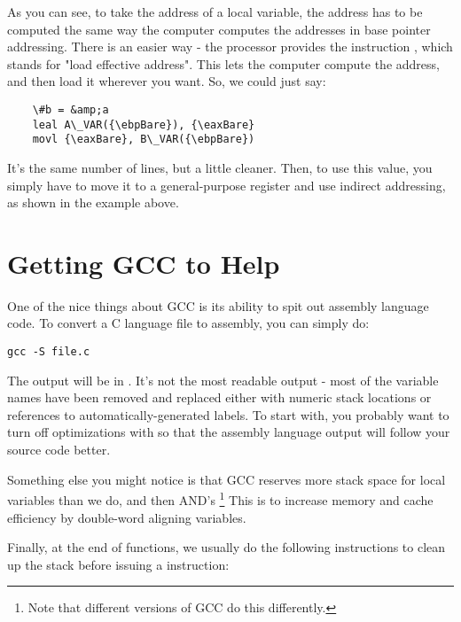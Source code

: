 As you can see, to take the address of a local variable, the address has to
be computed the same way the computer computes the addresses in base 
pointer addressing.  There is an easier way - the processor provides the
instruction , which stands for "load effective address".
This lets the computer compute the address, and then load it wherever you want.
So, we could just say:

\begin{simpletyping}
\begin{lstlisting}
	\#b = &amp;a
	leal A\_VAR({\ebpBare}), {\eaxBare}
	movl {\eaxBare}, B\_VAR({\ebpBare})
\end{lstlisting}
\end{simpletyping}

It's the same number of lines, but a little cleaner.  Then, to use
this value, you simply have to move it to a general-purpose register
and use indirect addressing, as shown in the example above.

\section{Getting GCC to Help}

One of the nice things about GCC is its ability to spit out assembly
language code.  To convert a C language file to assembly, you can simply
do:

\begin{simpletyping}
\begin{lstlisting}
gcc -S file.c
\end{lstlisting}
\end{simpletyping}

The output will be in .  It's not the most
readable output - most of the variable names have been removed and replaced
either with numeric stack locations or references to automatically-generated
labels.  To start with, you probably want to turn off optimizations with
 so that the assembly language output will follow
your source code better.

Something else you might notice is that GCC reserves more stack space
for local variables than we do, and then AND's {\espRegIdx}
\footnote{Note that different versions of GCC do this differently.  
}
This is to increase memory and cache efficiency by double-word aligning 
variables.

Finally, at the end of functions, we usually do the following instructions
to clean up the stack before issuing a  instruction:

